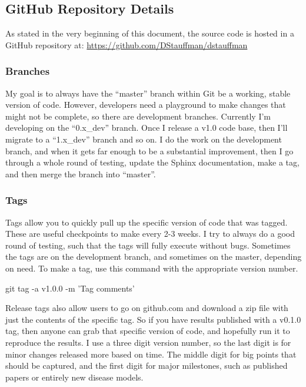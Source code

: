 \documentclass[12pt]{article}
\begin{document}
\subsection{GitHub Repository Details}\label{h2:github_details}
As stated in the very beginning of this document, the source code is hosted in a GitHub repository at:
\url{https://github.com/DStauffman/dstauffman}

\subsubsection{Branches}
My goal is to always have the ``master'' branch within Git be a working, stable version of code.  However, developers need a playground to make changes that might not be complete, so there are development branches.  Currently I'm developing on the ``0.x\_dev'' branch.  Once I release a v1.0 code base, then I'll migrate to a ``1.x\_dev'' branch and so on.  I do the work on the development branch, and when it gets far enough to be a substantial improvement, then I go through a whole round of testing, update the Sphinx documentation, make a tag, and then merge the branch into ``master''.

\subsubsection{Tags}
Tags allow you to quickly pull up the specific version of code that was tagged.  These are useful checkpoints to make every 2-3 weeks.  I try to always do a good round of testing, such that the tags will fully execute without bugs.  Sometimes the tags are on the development branch, and sometimes on the master, depending on need.  To make a tag, use this command with the appropriate version number.

\begin{PlainText}
git tag -a v1.0.0 -m 'Tag comments'
\end{PlainText}

Release tags also allow users to go on github.com and download a zip file with just the contents of the specific tag.  So if you have results published with a v0.1.0 tag, then anyone can grab that specific version of code, and hopefully run it to reproduce the results.  I use a three digit version number, so the last digit is for minor changes released more based on time.  The middle digit for big points that should be captured, and the first digit for major milestones, such as published papers or entirely new disease models.
\end{document}
